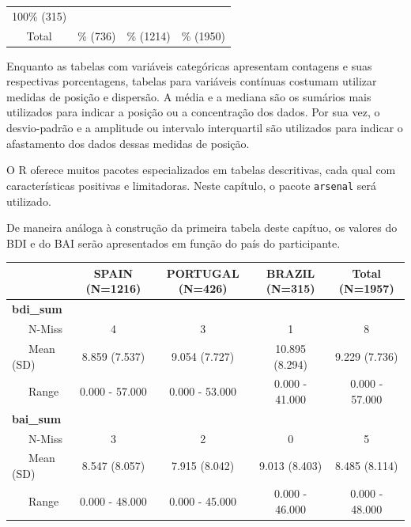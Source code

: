 \documentclass[
]{book}
\newenvironment{Shaded}{\begin{snugshade}}{\end{snugshade}}
\newcommand{\DataTypeTok}[1]{\textcolor[rgb]{0.13,0.29,0.53}{#1}}
\newcommand{\KeywordTok}[1]{\textcolor[rgb]{0.13,0.29,0.53}{\textbf{#1}}}
\newcommand{\NormalTok}[1]{#1}
\newcommand{\OperatorTok}[1]{\textcolor[rgb]{0.81,0.36,0.00}{\textbf{#1}}}
\newcommand{\OtherTok}[1]{\textcolor[rgb]{0.56,0.35,0.01}{#1}}
\newcommand{\StringTok}[1]{\textcolor[rgb]{0.31,0.60,0.02}{#1}}
\begin{document}
\begin{longtable}[]{@{}cccc@{}}
\begin{minipage}[t]{0.17\columnwidth}
100\% (315)\strut
\end{minipage}\tabularnewline
\begin{minipage}[t]{0.14\columnwidth}\centering
Total\strut
\end{minipage} & \begin{minipage}[t]{0.15\columnwidth}\centering
38\% (736)\strut
\end{minipage} & \begin{minipage}[t]{0.16\columnwidth}\centering
62\% (1214)\strut
\end{minipage} & \begin{minipage}[t]{0.17\columnwidth}\centering
100\% (1950)\strut
\end{minipage}\tabularnewline
\bottomrule
\end{longtable}

Enquanto as tabelas com variáveis categóricas apresentam contagens e
suas respectivas porcentagens, tabelas para variáveis contínuas costumam
utilizar medidas de posição e dispersão. A média e a mediana são os
sumários mais utilizados para indicar a posição ou a concentração dos
dados. Por sua vez, o desvio-padrão e a amplitude ou intervalo
interquartil são utilizados para indicar o afastamento dos dados dessas
medidas de posição.

O R oferece muitos pacotes especializados em tabelas descritivas, cada
qual com características positivas e limitadoras. Neste capítulo, o
pacote \texttt{arsenal} será utilizado.

De maneira análoga à construção da primeira tabela deste capítuo, os
valores do BDI e do BAI serão apresentados em função do país do
participante.

\begin{Shaded}
\end{Shaded}

\begin{longtable}[]{@{}lcccc@{}}
\toprule
& SPAIN (N=1216) & PORTUGAL (N=426) & BRAZIL (N=315) & Total
(N=1957)\tabularnewline
\midrule
\endhead
\textbf{bdi\_sum} & & & &\tabularnewline
~~~N-Miss & 4 & 3 & 1 & 8\tabularnewline
~~~Mean (SD) & 8.859 (7.537) & 9.054 (7.727) & 10.895 (8.294) & 9.229
(7.736)\tabularnewline
~~~Range & 0.000 - 57.000 & 0.000 - 53.000 & 0.000 - 41.000 & 0.000 -
57.000\tabularnewline
\textbf{bai\_sum} & & & &\tabularnewline
~~~N-Miss & 3 & 2 & 0 & 5\tabularnewline
~~~Mean (SD) & 8.547 (8.057) & 7.915 (8.042) & 9.013 (8.403) & 8.485
(8.114)\tabularnewline
~~~Range & 0.000 - 48.000 & 0.000 - 45.000 & 0.000 - 46.000 & 0.000 -
48.000\tabularnewline
\bottomrule
\end{longtable}
\end{document}
